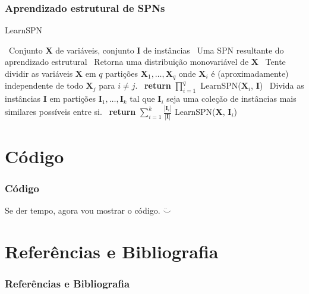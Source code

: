 \documentclass[10pt]{beamer}
\theoremstyle{plain}
\newcommand{\set}[1]{\mathbf{#1}}
\begin{document}
\begin{frame}
  \frametitle{Aprendizado estrutural de SPNs}
  \begin{algorithm}[H]
    \caption{LearnSPN~\cite{gens-domingos}}\label{learn-alg}
    \begin{algorithmic}[1]
      \Require~Conjunto $\set{X}$ de variáveis, conjunto $\set{I}$ de instâncias
      \Ensure~Uma SPN resultante do aprendizado estrutural
      \If{$|\set{X}|=1$}
        \State~Retorna uma distribuição monovariável de $\set{X}$
      \EndIf
      \State~Tente dividir as variáveis $\set{X}$ em $q$ partições $\set{X}_1,\ldots,\set{X}_q$
        onde $\set{X}_i$ é (aproximadamente) independente de todo $\set{X}_j$ para $i\neq j$.
        \State~\textbf{return} $\prod_{i=1}^q$ LearnSPN($\set{X}_i$, $\set{I}$)
      \Else
        \State~Divida as instâncias $\set{I}$ em partições $\set{I}_1,\ldots,\set{I}_k$ tal que
          $\set{I}_i$ seja uma coleção de instâncias mais similares possíveis entre si.
        \State~\textbf{return} $\sum_{i=1}^k \frac{|\set{I}_i|}{|\set{I}|}$ LearnSPN($\set{X}$,
          $\set{I}_i$)
      \EndIf
    \end{algorithmic}
  \end{algorithm}
\end{frame}


\section{Código}

\begin{frame}
  \frametitle{Código}

  Se der tempo, agora vou mostrar o código. $\ddot\smile$
\end{frame}


\section[Referências]{Referências e Bibliografia}
\begin{frame}[t,allowframebreaks]
  \frametitle{Referências e Bibliografia}
  \footnotesize
  \printbibliography[]
\end{frame}
\end{document}

